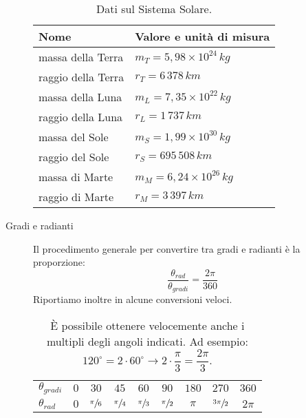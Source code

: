 \documentclass[a4paper,11pt,italian]{article}
\begin{document}
\begin{description}
  \begin{table}[htp]\centering
    \begin{tabular}{ll}\toprule
      \textbf{Nome} & \textbf{Valore e unità di misura}\\\midrule
      massa della Terra & $ m_T = 5,98 \times 10^{24} \, kg	$ \\\addlinespace[.2em]
      raggio della Terra & $ r_T = 6 \, 378 \, km $ \\\addlinespace[.2em]
      massa della Luna & $ m_L = 7,35 \times 10^{22} \, kg $ \\\addlinespace[.2em]
      raggio della Luna & $ r_L = 1 \, 737 \, km $ \\\addlinespace[.2em]
      massa del Sole & $ m_S = 1,99 \times 10^{30} \, kg $ \\\addlinespace[.2em]
      raggio del Sole & $ r_S = 695 \, 508 \, km $ \\\addlinespace[.2em]
      massa di Marte & $ m_M = 6,24 \times 10^{26} \, kg $ \\\addlinespace[.2em]
      raggio di Marte & $ r_M = 3 \, 397 \, km $ \\\bottomrule
    \end{tabular}
  \caption{Dati sul Sistema Solare.}
    \label{tab:datisistemasolare}
  \end{table}  

  \item[Gradi e radianti] Il procedimento generale per convertire tra gradi e radianti è la proporzione:
  \[ \frac{\theta_{rad}}{\theta_{gradi}} = \frac{2\pi}{360} \]
  Riportiamo inoltre in  alcune conversioni veloci.
  \begin{table}[htp]\centering
    \begin{tabular}{lcccccccc}\toprule
        \boldmath$ \theta_{gradi} $ & $ 0 $ & $ 30 $ & $ 45 $ & $ 60 $ & $ 90 $ & $ 180 $ & $ 270 $ & $ 360 $\\\addlinespace[.2em]\midrule
        \boldmath$ \theta_{rad} $ & $ 0 $ & $ \sfrac{\pi}{6} $ & $ \sfrac{\pi}{4} $ & $ \sfrac{\pi}{3} $ & $ \sfrac{\pi}{2} $ & $ \pi $ & $ \sfrac{3\pi}{2} $ & $ 2\pi $\\\bottomrule
    \end{tabular}
    \caption{È possibile ottenere velocemente anche i multipli degli angoli indicati. Ad esempio: $ 120^{\circ} = 2\cdot 60^{\circ} \rightarrow 2 \cdot \dfrac{\pi}{3} = \dfrac{2\pi}{3} $.}\label{tab:gradiradianti}
  \end{table}
\end{description}
\end{document}
